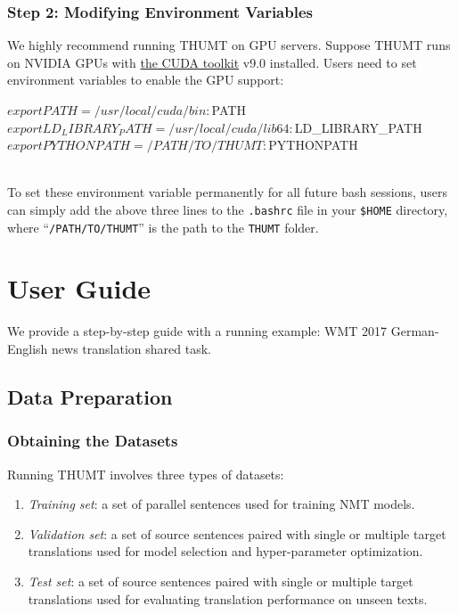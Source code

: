 \documentclass{article}
\begin{document}
\subsubsection{Step 2: Modifying Environment Variables}
We highly recommend running THUMT on GPU servers. Suppose THUMT runs on NVIDIA GPUs with \href{https://developer.nvidia.com/cuda-toolkit}{the CUDA toolkit} v9.0 installed. Users need to set environment variables to enable the GPU support:
\\
\begin{everbatim}
$ export PATH=/usr/local/cuda/bin:$PATH
$ export LD_LIBRARY_PATH=/usr/local/cuda/lib64:$LD_LIBRARY_PATH
$ export PYTHONPATH=/PATH/TO/THUMT:$PYTHONPATH
\end{everbatim}
\\
To set these environment variable permanently for all future bash sessions, users can simply add the above three lines to the \verb|.bashrc| file in your \verb|$HOME| directory, where ``\verb|/PATH/TO/THUMT|'' is the path to the \verb|THUMT| folder.

\section{User Guide}

We provide a step-by-step guide with a running example: WMT 2017 German-English news translation shared task.

\subsection{Data Preparation}
\subsubsection{Obtaining the Datasets}
Running THUMT involves three types of datasets:

\begin{enumerate}
\item {\em Training set}: a set of parallel sentences used for training NMT models.
\item {\em Validation set}: a set of source sentences paired with single or multiple target translations used for model selection and hyper-parameter optimization.
\item {\em Test set}: a set of source sentences paired with single or multiple target translations used for evaluating translation performance on unseen texts.
\end{enumerate}
\end{document}
